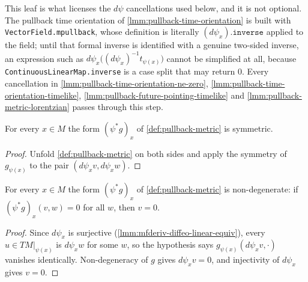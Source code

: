 This leaf is what licenses the $d\psi$ cancellations used below, and it is not optional. The pullback time orientation of \ref{lmm:pullback-time-orientation} is built with \texttt{VectorField.mpullback}, whose definition is literally $(d\psi_x).\mathtt{inverse}$ applied to the field; until that formal inverse is identified with a genuine two-sided inverse, an expression such as $d\psi_x\big((d\psi_x)^{-1} t_{\psi(x)}\big)$ cannot be simplified at all, because \texttt{ContinuousLinearMap.inverse} is a case split that may return $0$. Every cancellation in \ref{lmm:pullback-time-orientation-ne-zero}, \ref{lmm:pullback-time-orientation-timelike}, \ref{lmm:pullback-future-pointing-timelike} and \ref{lmm:pullback-metric-lorentzian} passes through this step.

\begin{lemma}
    \label{lmm:pullback-metric-symm}
    For every $x \in M$ the form $(\psi^*g)_x$ of \ref{def:pullback-metric} is symmetric.
\end{lemma}
\begin{proof}
    Unfold \ref{def:pullback-metric} on both sides and apply the symmetry of $g_{\psi(x)}$ to the pair $(d\psi_x v, d\psi_x w)$.
\end{proof}

\begin{lemma}
    \label{lmm:pullback-metric-nondegenerate}
    For every $x \in M$ the form $(\psi^*g)_x$ of \ref{def:pullback-metric} is non-degenerate: if $(\psi^*g)_x(v,w) = 0$ for all $w$, then $v = 0$.
\end{lemma}
\begin{proof}
    Since $d\psi_x$ is surjective (\ref{lmm:mfderiv-diffeo-linear-equiv}), every $u \in TM|_{\psi(x)}$ is $d\psi_x w$ for some $w$, so the hypothesis says $g_{\psi(x)}(d\psi_x v, \cdot)$ vanishes identically. Non-degeneracy of $g$ gives $d\psi_x v = 0$, and injectivity of $d\psi_x$ gives $v = 0$.
\end{proof}

